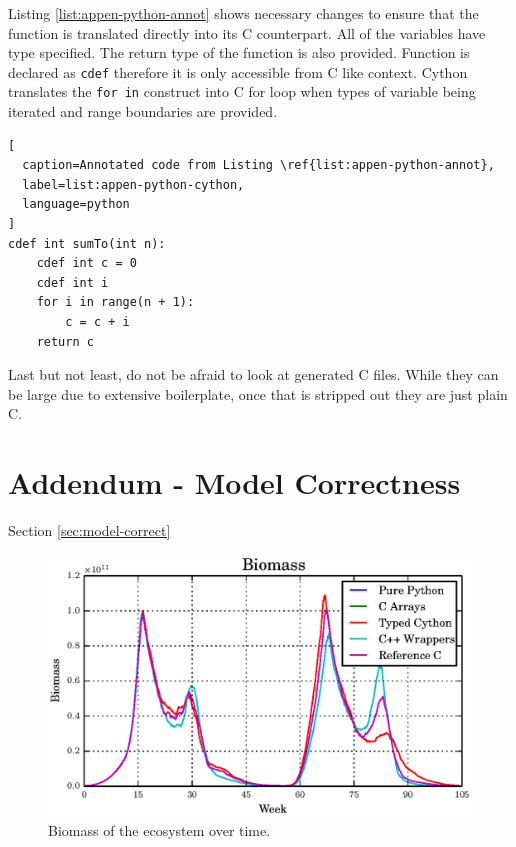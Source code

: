 \documentclass[12pt, a4paper]{report}
\begin{document}
\begin{appendices}
Listing \ref{list:appen-python-annot} shows necessary changes to ensure that the
function is translated directly into its C counterpart. All of the variables
have type specified. The return type of the function is also provided. Function
is declared as \lstinline{cdef} therefore it is only accessible from C like context.
Cython translates the \lstinline{for in} construct into C for loop when types of
variable being iterated and range boundaries are provided.

\begin{lstlisting}[
  caption=Annotated code from Listing \ref{list:appen-python-annot},
  label=list:appen-python-cython,
  language=python
]
cdef int sumTo(int n):
    cdef int c = 0
    cdef int i
    for i in range(n + 1):
        c = c + i
    return c
\end{lstlisting}

Last but not least, do not be afraid to look at generated C files. While they
can be large due to extensive boilerplate, once that is stripped out they are
just plain C.

\chapter{Addendum - Model Correctness}\label{appen-ch:add-model-correctness}
Section \ref{sec:model-correct}

\begin{figure}[H]
  \begin{center}
    \includegraphics[width=\columnwidth]{graphs/bio-fixed-single-float-comp.eps}
    \caption{Biomass of the ecosystem over time.}
    \label{fig:master-bio}
  \end{center}
\end{figure}


\end{appendices}
\end{document}

